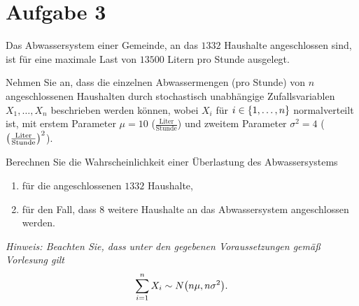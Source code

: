 \documentclass{exercise}
\begin{document}
    \section*{Aufgabe 3}
    
    \begin{problem}
        Das Abwassersystem einer Gemeinde, an das \(1332\) Haushalte angeschlossen sind, ist für eine maximale Last von \(13500\) Litern pro Stunde ausgelegt.

        Nehmen Sie an, dass die einzelnen Abwassermengen (pro Stunde) von \(n\) angeschlossenen Haushalten durch stochastisch unabhängige Zufallsvariablen \(X_1, \ldots, X_n\) beschrieben werden können, wobei \(X_i\) für \(i \in \braces*{1, \ldots, n}\) normalverteilt ist, mit erstem Parameter \(\mu = 10\) (\(\frac{\text{Liter}}{\text{Stunde}}\)) und zweitem Parameter \(\sigma^2 = 4\) (\(\parentheses*{\frac{\text{Liter}}{\text{Stunde}}}^2\)).

        Berechnen Sie die Wahrscheinlichkeit einer Überlastung des Abwassersystems
        \begin{enumerate}
            \item für die angeschlossenen \(1332\) Haushalte,
            \item für den Fall, dass \(8\) weitere Haushalte an das Abwassersystem angeschlossen werden.
        \end{enumerate}
        \emph{Hinweis: Beachten Sie, dass unter den gegebenen Voraussetzungen gemäß Vorlesung gilt
        \[
            \sum_{i = 1}^n X_i \sim N\parentheses*{n\mu, n\sigma^2}.
        \]}
    \end{problem}
    
\end{document}
